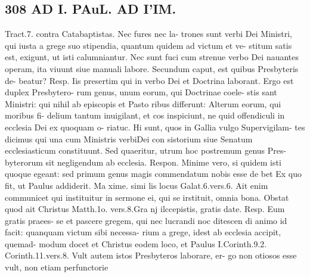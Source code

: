\documentclass{article}
\begin{document}
\begin{pages}
\section*{308 AD I. PAuL. AD I'IM. }Tract.7. contra Catabaptistas. Nec fures nec la- trones sunt verbi Dei Ministri, qui iusta a grege suo stipendia, quantum quidem ad victum et ve- stitum satis est, exigunt, ut isti calumniantur. Nec sunt fuci cum strenue verbo Dei nauantes operam, ita viuunt siue manuali labore. Secundum caput, est quibus Presbyteris de- beatur? Resp. Iis presertim qui in verbo Dei et Doctrina laborant. Ergo est duplex Presbytero- rum genus, unum eorum, qui Doctrinae coele- stis sant Ministri: qui nihil ab episcopis et Pasto ribus differunt: Alterum eorum, qui moribus fi- delium tantum inuigilant, et cos inspiciunt, ne quid offendiculi in ecclesia Dei ex quoquam o- riatuc. Hi sunt, quos in Gallia vulgo Supervigilam- tes dicimus qui una cum Ministris verbiDei con sistorium siue Senatum ecclesiasticum constituunt. Sed quaeritur, utrum hoc postremum genus Pres- byterorum sit negligendum ab ecclesia. Respon. Minime vero, si quidem isti quoque egeant: sed primum genus magis commendatum nobis esse de bet Ex quo fit, ut Paulus addiderit. Ma xime. simi lis locus Galat.6.vers.6. Ait enim communicet qui instituitur in sermone ei, qui se irstituit, omnia bona. Obstat quod ait Christus Matth.1o. vers.8.Gra nj ilccepistis, gratis date. Resp. Eum gratis praees- se et pascere gregem, qui nec lucrandi noc ditescen di animo id facit: quanquam victum sibi necessa- rium a grege, idest ab ecclesia accipit, quemad- modum docet et Christus eodem loco, et Paulus I.Corinth.9.2. Corinth.11.vers.8. Vult autem istos Presbyteros laborare, er- go non otiosos esse vult, non etiam perfunctorie 

\end{pages}
\end{document}
